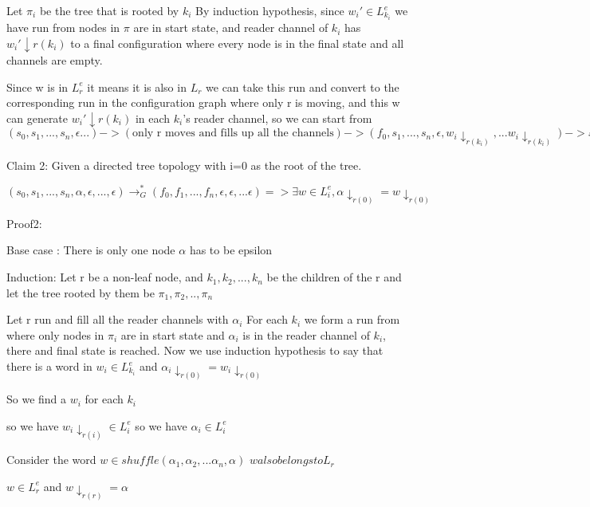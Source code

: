 \documentclass{article}
\begin{document}
Let $\pi_i$ be the tree that is rooted by $k_i$
By induction hypothesis, since $w_i' \in L_{k_i}^e$ we have run from nodes in $\pi$ are in start state, and reader channel of $k_i$ has $w_i'\downarrow{r(k_i)}$ 
to a final configuration where every node is in the final state and all channels are empty.

Since w is in $L_r^e$ it means it is also in $L_r$ we can take this run and convert to the corresponding run in the configuration graph where only r is moving, 
and this w can generate $w_i'\downarrow{r(k_i)}$ in each $k_i$'s reader channel, so we can start from $(s_0, s_1,...,s_n, \epsilon ...) -> (\text{only r moves and fills up all the channels}) -> (f_0, s_1, ..., s_n,\epsilon, w_i\downarrow_{r(k_i)}, ... w_i\downarrow_{r(k_i)} ) -> stitch the k_i run one after the other$ 










Claim 2: Given a directed tree topology with i=0 as the root of the tree.

$(s_0, s_1, ...,s_n, \alpha, \epsilon, ...,\epsilon) \rightarrow_G^* (f_0, f_1, ..., f_n, \epsilon, \epsilon, ... \epsilon) => \exists w \in L_i^e,   \alpha \downarrow_{r(0)} = w \downarrow_{r(0)}$


Proof2:

Base case : There is only one node $\alpha$ has to be epsilon 

Induction: 
Let r be a non-leaf node, and $k_1, k_2, ..., k_n$ be the children of the r and let the tree rooted by them be $\pi_1, \pi_2, .., \pi_n$ 

Let r run and fill all the reader channels with $\alpha_i$
For each $k_i$ we form a run from where only nodes in $\pi_i$ are in start state and $\alpha_i$ is in the reader channel of $k_i$, there and final state is reached. Now we use induction hypothesis to say that there is a word in $w_i \in L_{k_i}^e$ and $\alpha_i \downarrow_{r(0)} = w_i \downarrow_{r(0)}$

So we find a $w_i$ for each $k_i$

so we have $w_i \downarrow_{r(i)} \in L_i^e$ 
so we have  $\alpha_i \in L_i^e$ 

Consider the word $w \in shuffle(\alpha_1, \alpha_2,...\alpha_n, \alpha)$
$w also belongs to L_r$

$w \in L_r^e$ and $w \downarrow_{r(r)} = \alpha $ 
\end{document}
